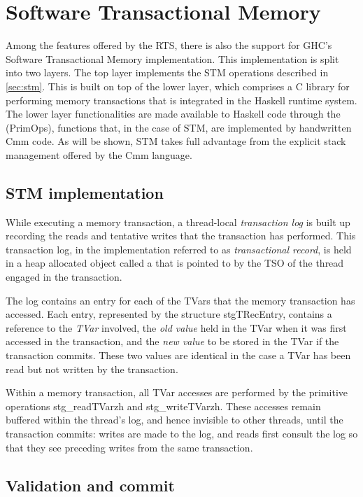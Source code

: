 \section{Software Transactional Memory}

Among the features offered by the RTS, there is also the support for GHC's Software Transactional Memory implementation.
This implementation is split into two layers.
The top layer implements the STM operations described in \cref{sec:stm}.
This is built on top of the lower layer, which comprises a C library for performing memory transactions that is integrated in the Haskell runtime system.
The lower layer functionalities are made available to Haskell code through the  (PrimOps), \ie functions that, in the case of STM, are implemented by handwritten Cmm code.
As will be shown, STM takes full advantage from the explicit stack management offered by the Cmm language.

\subsection{STM implementation}
While executing a memory transaction, a thread-local \emph{transaction log} is built up recording the reads and tentative writes that the transaction has performed.
This transaction log, in the implementation referred to as \emph{transactional record}, is held in a heap allocated object called a  that is pointed to by the TSO of the thread engaged in the transaction.

The log contains an entry for each of the TVars that the memory transaction has accessed.
Each entry, represented by the structure stgTRecEntry, contains a reference to the \emph{TVar} involved, the \emph{old value} held in the TVar when it was first accessed in the transaction, and the \emph{new value} to be stored in the TVar if the transaction commits.
These two values are identical in the case a TVar has been read but not written by the transaction.

Within a memory transaction, all TVar accesses are performed by the primitive operations stg\_readTVarzh and stg\_writeTVarzh. These accesses remain buffered within the thread’s log, and hence invisible to other threads, until the transaction commits: writes are made to the log, and reads first consult the log so that they see preceding writes from the same transaction.

\subsection{Validation and commit}

